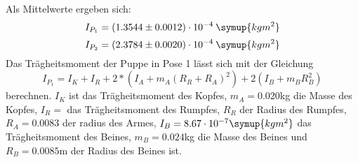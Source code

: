 Als Mittelwerte ergeben sich:
\begin{equation}
  I_{P_1} = (1.3544 \pm 0.0012)\cdot 10^{-4}\: \symup{kgm^2}
\end{equation}
\begin{equation}
  I_{P_2} = (2.3784 \pm 0.0020)\cdot 10^{-4}\: \symup{kgm^2}
\end{equation}
Das Trägheitsmoment der Puppe in Pose 1 lässt sich mit der Gleichung
\begin{equation}
  I_{P_1} = I_K + I_R + 2*(I_A + m_A(R_R + R_A)^2) + 2(I_B + m_B R_B^2)
\end{equation}
berechnen. $I_K$ ist das Trägheitsmoment des Kopfes, $m_A= 0.020$kg die Masse des Kopfes,
$I_R = $ das Trägheitsmoment des Rumpfes,
$R_R$ der Radius des Rumpfes, $R_A = 0.0083$ der radius des Armes, $I_B = 8.67 \cdot 10^{-7} \symup{kgm^2}$ das Trägheitsmoment des Beines,
$m_B = 0.024$kg die Masse des Beines und $R_B = 0.0085$m der Radius des Beines ist.
